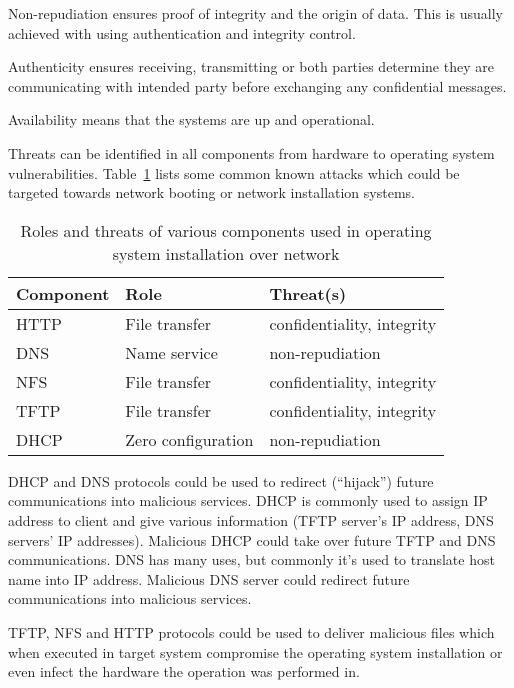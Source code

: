 Non-repudiation ensures proof of integrity and the origin of
data. This is usually achieved with using authentication and integrity
control.

Authenticity ensures receiving, transmitting or both parties determine
they are communicating with intended party before exchanging any
confidential messages.

Availability means that the systems are up and operational.

Threats can be identified in all components from hardware to operating
system vulnerabilities. Table~\ref{tab:threats_table} lists some
common known attacks which could be targeted towards network booting
or network installation systems.

\begin{table}[!ht]
  \def\arraystretch{1.1}%
  \begin{center}
   \caption{Roles and threats of various components used in operating
      system installation over network}
    \begin{tabular}{| l | l | l |}
      \hline
      Component   & Role               & Threat(s)                  \\
      \hline
      HTTP        & File transfer      & confidentiality, integrity \\
      DNS         & Name service       & non-repudiation            \\
      NFS         & File transfer      & confidentiality, integrity \\
      TFTP        & File transfer      & confidentiality, integrity \\
      DHCP        & Zero configuration & non-repudiation            \\
      \hline
    \end{tabular}
    \label{tab:threats_table}
  \end{center}
\end{table}

DHCP and DNS protocols could be used to redirect (``hijack'') future
communications into malicious services. DHCP is commonly used to
assign IP address to client and give various information (TFTP
server's IP address, DNS servers' IP addresses). Malicious DHCP could
take over future TFTP and DNS communications. DNS has many uses, but
commonly it's used to translate host name into IP address. Malicious
DNS server could redirect future communications into malicious
services.

TFTP, NFS and HTTP protocols could be used to deliver malicious files
which when executed in target system compromise the operating system
installation or even infect the hardware the operation was performed
in.

